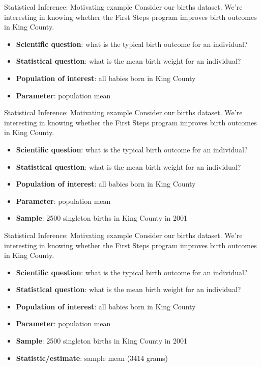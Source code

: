 \documentclass[
  ignorenonframetext,
]{beamer}
\providecommand{\tightlist}{%
  \setlength{\itemsep}{0pt}\setlength{\parskip}{0pt}}
\begin{document}
\begin{frame}{Statistical Inference: Motivating example}
\protect\hypertarget{statistical-inference-motivating-example-3}{}
Consider our births dataset. We're interesting in knowing whether the
First Steps program improves birth outcomes in King County.

\begin{itemize}
\tightlist
\item
  \textbf{Scientific question}: what is the {typical} {birth outcome}
  for an individual?
\item
  \textbf{Statistical question}: what is the {mean} {birth weight} for
  an individual?
\item
  \textbf{Population of interest}: all babies born in King County
\item
  \textbf{Parameter}: population mean
\end{itemize}
\end{frame}

\begin{frame}{Statistical Inference: Motivating example}
\protect\hypertarget{statistical-inference-motivating-example-4}{}
Consider our births dataset. We're interesting in knowing whether the
First Steps program improves birth outcomes in King County.

\begin{itemize}
\tightlist
\item
  \textbf{Scientific question}: what is the {typical} {birth outcome}
  for an individual?
\item
  \textbf{Statistical question}: what is the {mean} {birth weight} for
  an individual?
\item
  \textbf{Population of interest}: all babies born in King County
\item
  \textbf{Parameter}: population mean
\item
  \textbf{Sample}: 2500 singleton births in King County in 2001
\end{itemize}
\end{frame}

\begin{frame}{Statistical Inference: Motivating example}
\protect\hypertarget{statistical-inference-motivating-example-5}{}
Consider our births dataset. We're interesting in knowing whether the
First Steps program improves birth outcomes in King County.

\begin{itemize}
\item
  \textbf{Scientific question}: what is the {typical} {birth outcome}
  for an individual?
\item
  \textbf{Statistical question}: what is the {mean} {birth weight} for
  an individual?
\item
  \textbf{Population of interest}: all babies born in King County
\item
  \textbf{Parameter}: population mean
\item
  \textbf{Sample}: 2500 singleton births in King County in 2001
\item
  \textbf{Statistic/estimate}: sample mean (3414 grams)
\end{itemize}
\end{frame}
\end{document}
